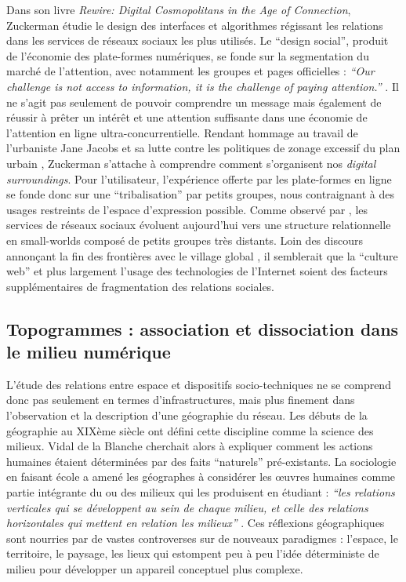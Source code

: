 Dans son livre \textit{Rewire: Digital Cosmopolitans in the Age of Connection}, Zuckerman étudie le design des interfaces et algorithmes régissant les relations dans les services de réseaux sociaux les plus utilisés. Le ``design social'', produit de l'économie des plate-formes numériques, se fonde sur la segmentation du marché de l’attention, avec notamment les groupes et pages officielles : \textit{``Our challenge is not access to information, it is the challenge of paying attention.''} \cite{Zuckerman2013}. Il ne s’agit pas seulement de pouvoir comprendre un message mais également de réussir à prêter un intérêt et une attention suffisante dans une économie de l’attention en ligne ultra-concurrentielle. Rendant hommage au travail de l’urbaniste Jane Jacobs et sa lutte contre les politiques de zonage excessif du plan urbain \citep{Jacobs1961}, Zuckerman s’attache à comprendre comment s’organisent nos \textit{digital surroundings}. Pour l'utilisateur, l’expérience offerte par les plate-formes en ligne se fonde donc sur une ``tribalisation'' par petits groupes, nous contraignant à des usages restreints de l'espace d'expression possible. Comme observé par \cite{Kumar2006}, les services de réseaux sociaux évoluent aujourd’hui vers une structure relationnelle en small-worlds composé de petits groupes très distants. Loin des discours annonçant la fin des frontières avec le village global \citep{Breton1997}, il semblerait que la ``culture web'' et plus largement l’usage des technologies de l’Internet soient des facteurs supplémentaires de fragmentation des relations sociales. 


\subsection[Topogrammes : association et dissociation dans le milieu numérique]{Topogrammes : association et dissociation dans le milieu numérique}

L’étude des relations entre espace et dispositifs socio-techniques ne se comprend donc pas seulement en termes d’infrastructures, mais plus finement dans l’observation et la description d’une géographie du réseau. Les débuts de la géographie au XIXème siècle ont défini cette discipline comme la science des milieux. Vidal de la Blanche cherchait alors à expliquer comment les actions humaines étaient déterminées par des faits ``naturels'' pré-existants. La sociologie en faisant école a amené les géographes à considérer les œuvres humaines comme partie intégrante du ou des milieux qui les produisent \citep{Demangeot1984} en étudiant : \textit{``les relations verticales qui se développent au sein de chaque milieu, et celle des relations horizontales qui mettent en relation les milieux''} \citep{Claval1990}. Ces réflexions géographiques sont nourries par de vastes controverses sur de nouveaux paradigmes : l'espace, le territoire, le paysage, les lieux qui estompent peu à peu l’idée déterministe de milieu pour développer un appareil conceptuel plus complexe. 

